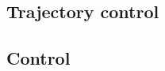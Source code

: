 

\subsection{Trajectory control} \label{sec:DOTcontrol}



\subsection{Control} \label{sec:DOTcontrol}
